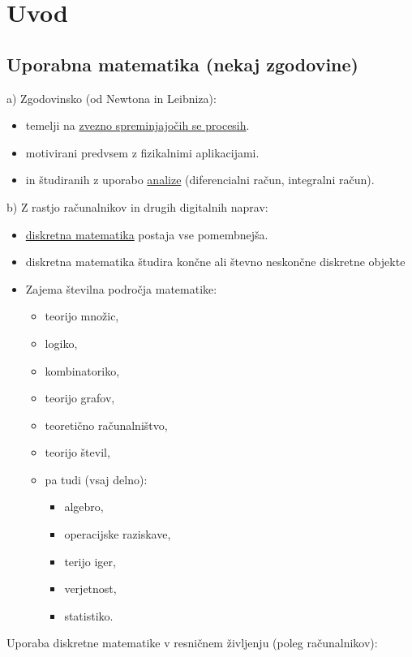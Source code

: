 \section{Uvod}
\subsection{Uporabna matematika (nekaj zgodovine)}

a) Zgodovinsko (od Newtona in Leibniza):
\begin{itemize}
    \item temelji na \underline{zvezno spreminjajočih se procesih}.
    \item motivirani predvsem z fizikalnimi aplikacijami.
    \item in študiranih z uporabo \underline{analize} (diferencialni račun, integralni račun).
\end{itemize}
b) Z rastjo računalnikov in drugih digitalnih naprav:
\begin{itemize}
    \item \underline{diskretna matematika} postaja vse pomembnejša.
    \item diskretna matematika študira končne ali števno neskončne diskretne objekte
    \item Zajema številna področja matematike: 
    \begin{itemize}
        \item teorijo množic, 
        \item logiko, 
        \item kombinatoriko, 
        \item teorijo grafov, 
        \item teoretično računalništvo, 
        \item teorijo števil, 
        \item pa tudi (vsaj delno): 
        \begin{itemize}
            \item algebro, 
            \item operacijske raziskave, 
            \item terijo iger, 
            \item verjetnost, 
            \item statistiko.
        \end{itemize}
    \end{itemize}
\end{itemize}
Uporaba diskretne matematike v resničnem življenju (poleg računalnikov):
